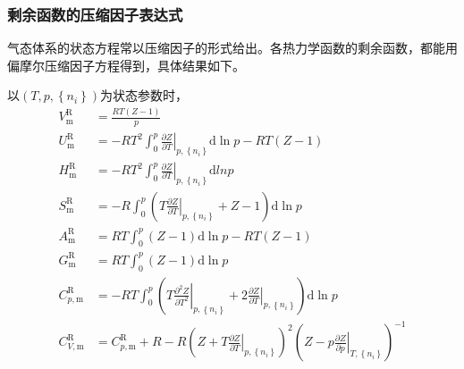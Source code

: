 \documentclass[main.tex]{subfiles}
\begin{document}
\subsubsection{剩余函数的压缩因子表达式}
气态体系的状态方程常以压缩因子的形式给出。各热力学函数的剩余函数，都能用偏摩尔压缩因子方程得到，具体结果如下。

以$\left(T,p,\left\{n_i\right\}\right)$为状态参数时，
\begin{align}
    V_\text{m}^\text{R}     & =\frac{RT\left(Z-1\right)}{p}                                                                                                                                                                         \\
    U_\text{m}^\text{R}     & =-RT^2\int_0^p\left.\frac{\partial Z}{\partial T}\right|_{p,\left\{n_i\right\}}\mathrm{d}\ln p-RT\left(Z-1\right)                                                                                     \\
    H_\text{m}^\text{R}     & =-RT^2\int_0^p\left.\frac{\partial Z}{\partial T}\right|_{p,\left\{n_i\right\}}\mathrm{d}ln p                                                                                                         \\
    S_\text{m}^\text{R}     & =-R\int_0^p\left(T\left.\frac{\partial Z}{\partial T}\right|_{p,\left\{n_i\right\}}+Z-1\right)\mathrm{d}\ln p                                                                                         \\
    A_\text{m}^\text{R}     & =RT\int_0^p\left(Z-1\right)\mathrm{d}\ln p-RT\left(Z-1\right)                                                                                                                                         \\
    G_\text{m}^\text{R}     & =RT\int_0^p\left(Z-1\right)\mathrm{d}\ln p                                                                                                                                                            \\
    C_{p,\text{m}}^\text{R} & =-RT\int_0^p\left(T\left.\frac{\partial^2 Z}{\partial T^2}\right|_{p,\left\{n_i\right\}}+2\left.\frac{\partial Z}{\partial T}\right|_{p,\left\{n_i\right\}}\right)\mathrm{d}\ln p                     \\
    C_{V,\text{m}}^\text{R} & =C_{p,\text{m}}^\text{R}+R-R\left(Z+T\left.\frac{\partial Z}{\partial T}\right|_{p,\left\{n_i\right\}}\right)^2\left(Z-p\left.\frac{\partial Z}{\partial p}\right|_{T,\left\{n_i\right\}}\right)^{-1}
\end{align}
\end{document}
